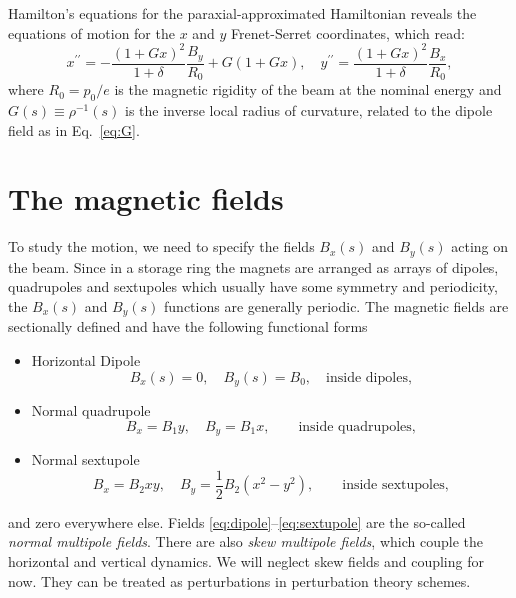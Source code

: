 Hamilton's equations for the paraxial-approximated Hamiltonian reveals the equations of motion for the $x$ and $y$ Frenet-Serret coordinates, which read:
\begin{equation}
x^{\prime \prime}=-\frac{(1+G x)^{2}}{1+\delta} \frac{B_{y}}{R_0}+G(1+G x),
\quad
y^{\prime \prime}=\frac{(1+G x)^{2}}{1+\delta} \frac{B_{x}}{R_0},
\label{eq:EOMs}
\end{equation}
where $R_0 = p_0/e$ is the magnetic rigidity of the beam at the nominal energy and $G(s)\equiv\rho^{-1}(s)$ is the inverse local radius of curvature, related to the dipole field as in Eq.~\eqref{eq:G}.

\section{The magnetic fields}
To study the motion, we need to specify the fields $B_x(s)$ and $B_y(s)$ acting on the beam. Since in a storage ring the magnets are arranged as arrays of dipoles, quadrupoles and sextupoles which usually have some symmetry and periodicity, the $B_x(s)$ and $B_y(s)$ functions are generally periodic. The magnetic fields are sectionally defined and have the following functional forms
\begin{itemize}
    \item Horizontal Dipole
           \begin{equation} B_x(s) = 0, \quad B_y(s) = B_0, \quad \text{inside dipoles},
            \label{eq:dipole}
           \end{equation}
    \item Normal quadrupole
          \begin{equation}B_x = B_1 y, \quad B_y = B_1 x, \quad \quad \text{inside quadrupoles},
            \label{eq:quadrupole}
           \end{equation}
    \item Normal sextupole
          \begin{equation}B_x = B_2xy, \quad B_y = \frac{1}{2}B_2(x^2 - y^2), \quad \quad \text{inside sextupoles},
            \label{eq:sextupole}
           \end{equation}
\end{itemize}
and zero everywhere else. Fields \eqref{eq:dipole}--\eqref{eq:sextupole}  are the so-called \textit{normal multipole fields}. There are also \textit{skew multipole fields}, which couple the horizontal and vertical dynamics. We will neglect skew fields and coupling for now. They can be treated as perturbations in perturbation theory schemes.

